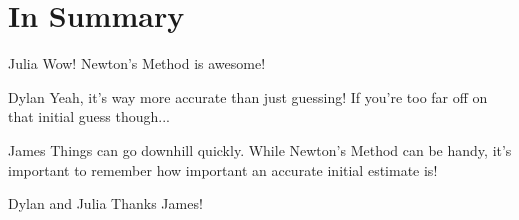 \documentclass{ximera}
\begin{document}
\section{In Summary}
\begin{dialogue}
\item[Julia] Wow! Newton's Method is awesome!
\item[Dylan] Yeah, it's way more accurate than just guessing! If you're too far off on that initial guess though...
\item[James] Things can go downhill quickly. While Newton's Method can be handy, it's important to remember how important an accurate initial estimate is!
\item[Dylan and Julia] Thanks James!
\end{dialogue}
\end{document}

